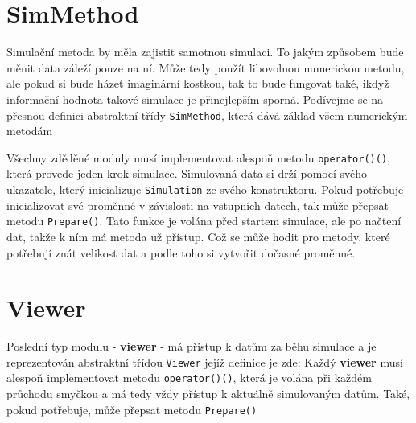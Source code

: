 \section{SimMethod}
Simulační metoda by měla zajistit samotnou simulaci. To jakým způsobem bude měnit data záleží pouze na ní. Může tedy použít libovolnou numerickou metodu, ale pokud si bude házet imaginární kostkou, tak to bude fungovat také, ikdyž informační hodnota takové simulace je přinejlepším sporná. Podívejme se na přesnou definici abstraktní třídy \texttt{SimMethod}, která dává základ všem numerickým metodám

Všechny zděděné moduly musí implementovat alespoň metodu \texttt{operator()()}, která provede jeden krok simulace. Simulovaná data si drží pomocí svého ukazatele,
který inicializuje \texttt{Simulation} ze svého konstruktoru.
Pokud potřebuje inicializovat své proměnné v závislosti na vstupních datech, tak může přepsat metodu \texttt{Prepare()}. Tato funkce je volána před startem simulace, ale po načtení dat, takže k ním má metoda už přístup. Což se může hodit pro metody, které potřebují znát velikost dat a podle toho si vytvořit dočasné proměnné.
\section{Viewer}
Poslední typ modulu - \textbf{viewer} - má přistup k datům za běhu simulace a  je  reprezentován abstraktní třídou \texttt{Viewer} jejíž definice je zde:
Každý \textbf{viewer} musí alespoň implementovat metodu \texttt{operator()()}, která je volána při každém průchodu smyčkou a má tedy vždy přístup k aktuálně simulovaným datům. Také, pokud potřebuje, může přepsat metodu \texttt{Prepare()}
